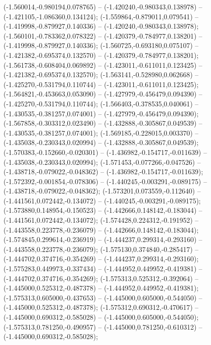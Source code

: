  (-1.560014,-0.980194,0.078765) -- (-1.420240,-0.980343,0.138978) -- (-1.421105,-1.086360,0.134124);
 (-1.559864,-0.879011,0.079541) -- (-1.419998,-0.879927,0.140336) -- (-1.420240,-0.980343,0.138978);
 (-1.560101,-0.783362,0.078322) -- (-1.420379,-0.784977,0.138201) -- (-1.419998,-0.879927,0.140336);
 (-1.560725,-0.693180,0.075107) -- (-1.421382,-0.695374,0.132570) -- (-1.420379,-0.784977,0.138201);
 (-1.561738,-0.608404,0.069892) -- (-1.423011,-0.611011,0.123425) -- (-1.421382,-0.695374,0.132570);
 (-1.563141,-0.528980,0.062668) -- (-1.425270,-0.531794,0.110744) -- (-1.423011,-0.611011,0.123425);
 (-1.564821,-0.453663,0.053090) -- (-1.427979,-0.456479,0.094390) -- (-1.425270,-0.531794,0.110744);
 (-1.566403,-0.378535,0.040061) -- (-1.430535,-0.381257,0.074001) -- (-1.427979,-0.456479,0.094390);
 (-1.567858,-0.303312,0.023490) -- (-1.432888,-0.305867,0.049539) -- (-1.430535,-0.381257,0.074001);
 (-1.569185,-0.228015,0.003370) -- (-1.435038,-0.230343,0.020994) -- (-1.432888,-0.305867,0.049539);
 (-1.570383,-0.152660,-0.020301) -- (-1.436982,-0.154717,-0.011639) -- (-1.435038,-0.230343,0.020994);
 (-1.571453,-0.077266,-0.047526) -- (-1.438718,-0.079022,-0.048362) -- (-1.436982,-0.154717,-0.011639);
 (-1.572392,-0.001854,-0.078306) -- (-1.440245,-0.003291,-0.089175) -- (-1.438718,-0.079022,-0.048362);
 (-1.573201,0.073559,-0.112640) -- (-1.441561,0.072442,-0.134072) -- (-1.440245,-0.003291,-0.089175);
 (-1.573880,0.148954,-0.150523) -- (-1.442666,0.148142,-0.183044) -- (-1.441561,0.072442,-0.134072);
 (-1.574428,0.224312,-0.191952) -- (-1.443558,0.223778,-0.236079) -- (-1.442666,0.148142,-0.183044);
 (-1.574845,0.299614,-0.236919) -- (-1.444237,0.299314,-0.293160) -- (-1.443558,0.223778,-0.236079);
 (-1.575130,0.374840,-0.285417) -- (-1.444702,0.374716,-0.354269) -- (-1.444237,0.299314,-0.293160);
 (-1.575283,0.449973,-0.337434) -- (-1.444952,0.449952,-0.419381) -- (-1.444702,0.374716,-0.354269);
 (-1.575313,0.525312,-0.392064) -- (-1.445000,0.525312,-0.487378) -- (-1.444952,0.449952,-0.419381);
 (-1.575313,0.605000,-0.437653) -- (-1.445000,0.605000,-0.544050) -- (-1.445000,0.525312,-0.487378);
 (-1.575312,0.690312,-0.470617) -- (-1.445000,0.690312,-0.585028) -- (-1.445000,0.605000,-0.544050);
 (-1.575313,0.781250,-0.490957) -- (-1.445000,0.781250,-0.610312) -- (-1.445000,0.690312,-0.585028);
